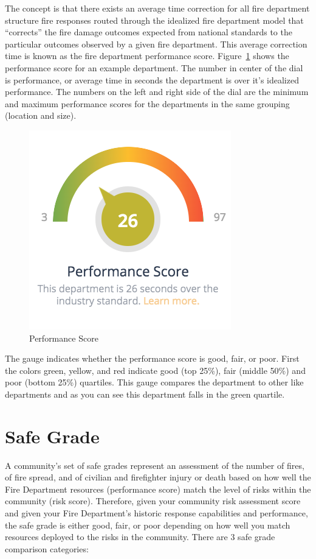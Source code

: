 \documentclass[12pt,oneside]{book}
\begin{document}
The concept is that there exists an average time correction for all fire department structure fire responses routed through the idealized fire department model that ``corrects'' the fire damage outcomes expected from national standards to the particular outcomes observed by a given fire department. This average correction time is known as the fire department performance score. Figure~\ref{fig:perform} shows the performance score for an example department. The number in center of the dial is performance, or average time in seconds the department is over it's idealized performance. The numbers on the left and right side of the dial are the minimum and maximum performance scores for the departments in the same grouping (location and size).

\begin{figure}[ht!]
\centering
\includegraphics[width=.5\columnwidth]{Figures/performance_score}
\caption{Performance Score}
\label{fig:perform}
\end{figure}

The gauge indicates whether the performance score is good, fair, or poor. First the colors green, yellow, and red indicate good (top 25\%), fair (middle 50\%) and poor (bottom 25\%) quartiles. This gauge compares the department to other like departments and as you can see this department falls in the green quartile. 

\FloatBarrier

\section{Safe Grade}

A community's set of safe grades represent an assessment of the number of fires, of fire spread, and of civilian and firefighter injury or death based on how well the Fire Department resources (performance score) match the level of risks within the community (risk score). Therefore, given your community risk assessment score and given your Fire Department's historic response capabilities and performance, the safe grade is either good, fair, or poor depending on how well you match resources deployed to the risks in the community. There are 3 safe grade comparison categories:
\end{document}
